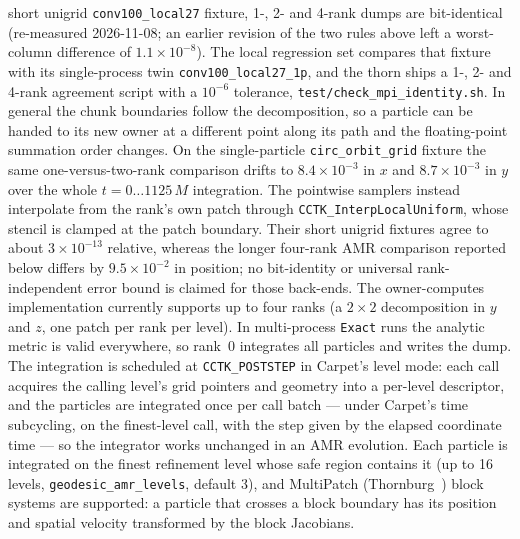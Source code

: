 \documentclass[11pt]{article}
\begin{document}
short unigrid \texttt{conv100\_local27} fixture, 1-, 2- and 4-rank dumps
are bit-identical (re-measured 2026-11-08; an earlier revision of the two
rules above left a worst-column difference of $1.1\times10^{-8}$).  The
local regression set compares that fixture with its single-process twin
\texttt{conv100\_local27\_1p}, and the thorn ships a 1-, 2- and 4-rank
agreement script with a $10^{-6}$ tolerance,
\texttt{test/check\_mpi\_identity.sh}.  In general the chunk boundaries
follow the decomposition, so a particle can be handed to its new owner at a
different point along its path and the floating-point summation order
changes.  On the single-particle \texttt{circ\_orbit\_grid} fixture the same
one-versus-two-rank comparison drifts to $8.4\times10^{-3}$ in $x$ and
$8.7\times10^{-3}$ in $y$ over the whole $t = 0 \ldots 1125\,M$ integration.
The pointwise samplers instead interpolate from the rank's own patch
through \texttt{CCTK\_InterpLocalUniform}, whose stencil is clamped at
the patch boundary.  Their short unigrid fixtures agree to about
$3\times10^{-13}$ relative, whereas the longer four-rank AMR comparison
reported below differs by $9.5\times10^{-2}$ in position; no bit-identity
or universal rank-independent error bound is claimed for those back-ends.
The owner-computes implementation currently supports up to four ranks (a
$2\times2$ decomposition in $y$ and $z$, one patch per rank per level).  In
multi-process \texttt{Exact} runs the
analytic metric is valid everywhere, so rank~0 integrates all particles
and writes the dump.  The integration is scheduled at
\texttt{CCTK\_POSTSTEP} in Carpet's level mode: each call acquires the
calling level's grid pointers and geometry into a per-level descriptor,
and the particles are integrated once per call batch --- under Carpet's
time subcycling, on the finest-level call, with the step given by the
elapsed coordinate time --- so the integrator works unchanged in an AMR
evolution.  Each particle is integrated on the finest refinement level
whose safe region contains it (up to 16 levels,
\texttt{geodesic\_amr\_levels}, default 3), and MultiPatch
(Thornburg~\citep{thornburg2004}) block systems are supported: a
particle that crosses a block boundary has its position and spatial
velocity transformed by the block Jacobians.
\end{document}
